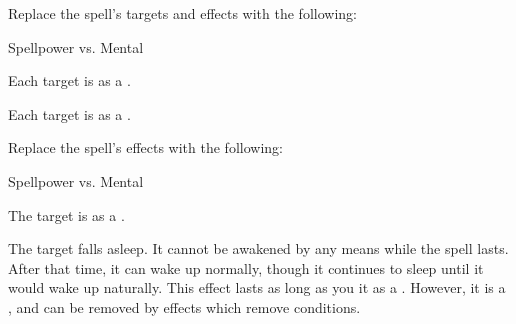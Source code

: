 


Replace the spell's targets and effects with the following:
\begin{spellcontent}

\begin{augmenttargetinginfo}




\end{augmenttargetinginfo}


\begin{augmenteffects}




\begin{spellattack}{Spellpower vs. Mental}


\hit Each target is \disoriented as a .


\crit Each target is \confused as a .


\end{spellattack}





\end{augmenteffects}

\end{spellcontent}








Replace the spell's effects with the following:
\begin{spellcontent}

\begin{augmenteffects}




\begin{spellattack}{Spellpower vs. Mental}


\hit The target is \blinded as a .


\crit
The target falls asleep.
It cannot be awakened by any means while the spell lasts.
After that time, it can wake up normally, though it continues to sleep until it would wake up naturally.
This effect lasts as long as you  it as a .
However, it is a , and can be removed by effects which remove conditions.



\end{spellattack}





\end{augmenteffects}

\end{spellcontent}






